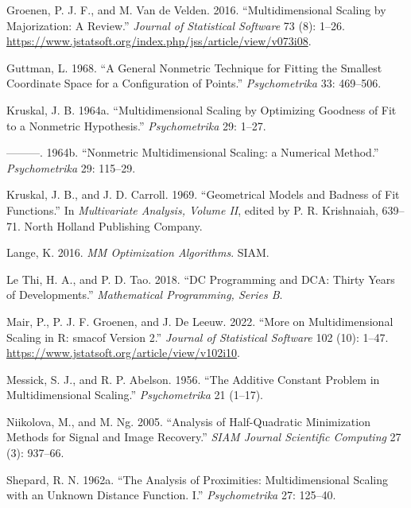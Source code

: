 \documentclass[
  12pt,
]{article}
\newlength{\cslhangindent}
\newenvironment{CSLReferences}[2] %
 {\begin{list}{}{%
  \setlength{\itemindent}{0pt}
  \setlength{\leftmargin}{0pt}
  \setlength{\parsep}{0pt}
  \ifodd #1
   \setlength{\leftmargin}{\cslhangindent}
   \setlength{\itemindent}{-1\cslhangindent}
  \fi
  \setlength{\itemsep}{#2\baselineskip}}}
 {\end{list}}
\begin{document}
\begin{CSLReferences}{1}{0}
Groenen, P. J. F., and M. Van de Velden. 2016. {``{Multidimensional Scaling by Majorization: A Review}.''} \emph{Journal of Statistical Software} 73 (8): 1--26. \url{https://www.jstatsoft.org/index.php/jss/article/view/v073i08}.

Guttman, L. 1968. {``{A General Nonmetric Technique for Fitting the Smallest Coordinate Space for a Configuration of Points}.''} \emph{Psychometrika} 33: 469--506.

Kruskal, J. B. 1964a. {``{Multidimensional Scaling by Optimizing Goodness of Fit to a Nonmetric Hypothesis}.''} \emph{Psychometrika} 29: 1--27.

---------. 1964b. {``{Nonmetric Multidimensional Scaling: a Numerical Method}.''} \emph{Psychometrika} 29: 115--29.

Kruskal, J. B., and J. D. Carroll. 1969. {``{Geometrical Models and Badness of Fit Functions}.''} In \emph{Multivariate Analysis, Volume II}, edited by P. R. Krishnaiah, 639--71. North Holland Publishing Company.

Lange, K. 2016. \emph{MM Optimization Algorithms}. SIAM.

Le Thi, H. A., and P. D. Tao. 2018. {``{DC Programming and DCA: Thirty Years of Developments}.''} \emph{Mathematical Programming, Series B}.

Mair, P., P. J. F. Groenen, and J. De Leeuw. 2022. {``{More on Multidimensional Scaling in R: smacof Version 2}.''} \emph{Journal of Statistical Software} 102 (10): 1--47. \url{https://www.jstatsoft.org/article/view/v102i10}.

Messick, S. J., and R. P. Abelson. 1956. {``{The Additive Constant Problem in Multidimensional Scaling}.''} \emph{Psychometrika} 21 (1--17).

Niikolova, M., and M. Ng. 2005. {``Analysis of Half-Quadratic Minimization Methods for Signal and Image Recovery.''} \emph{SIAM Journal Scientific Computing} 27 (3): 937--66.

Shepard, R. N. 1962a. {``{The Analysis of Proximities: Multidimensional Scaling with an Unknown Distance Function. I}.''} \emph{Psychometrika} 27: 125--40.


\end{CSLReferences}
\end{document}
